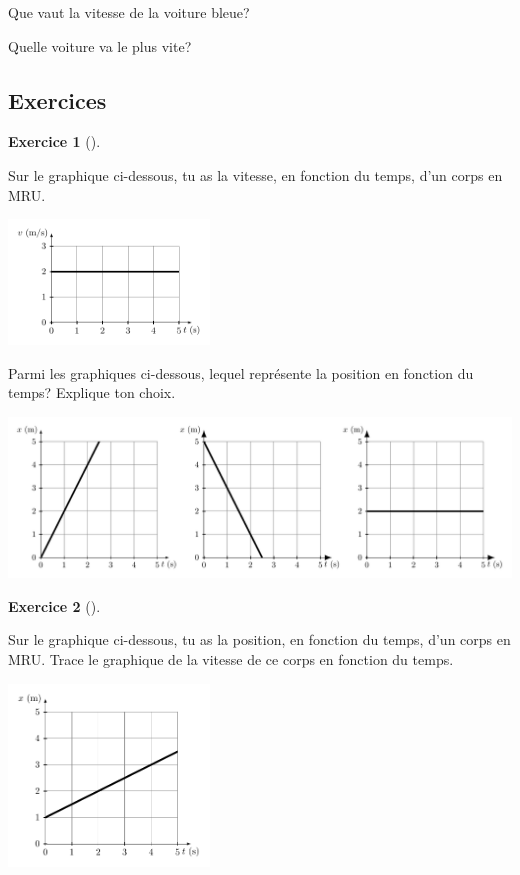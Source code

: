 \documentclass[
  a4paper,
  DIV=11,
  numbers=noendperiod,
  sans]{scrartcl}
\theoremstyle{definition}
\newtheorem{exercise}{Exercice}[section]
\theoremstyle{definition}
\theoremstyle{remark}
\begin{document}
Que vaut la vitesse de la voiture bleue?

Quelle voiture va le plus vite?

\newpage{}

\subsection{Exercices}\label{exercices}

\begin{exercise}[]\protect\hypertarget{exr-xapdv}{}\label{exr-xapdv}

Sur le graphique ci-dessous, tu as la vitesse, en fonction du temps,
d'un corps en MRU.

\begin{center}
\includegraphics[width=0.4\textwidth,height=\textheight]{figures/mru/fig6.pdf}
\end{center}

Parmi les graphiques ci-dessous, lequel représente la position en
fonction du temps? Explique ton choix. \begin{center}
\includegraphics[width=1\textwidth,height=\textheight]{figures/mru/fig7.pdf}
\end{center}

\end{exercise}

\begin{exercise}[]\protect\hypertarget{exr-vapdx}{}\label{exr-vapdx}

Sur le graphique ci-dessous, tu as la position, en fonction du temps,
d'un corps en MRU. Trace le graphique de la vitesse de ce corps en
fonction du temps.

\begin{center}
\includegraphics[width=0.4\textwidth,height=\textheight]{figures/mru/fig8.pdf}
\end{center}

\end{exercise}
\end{document}
